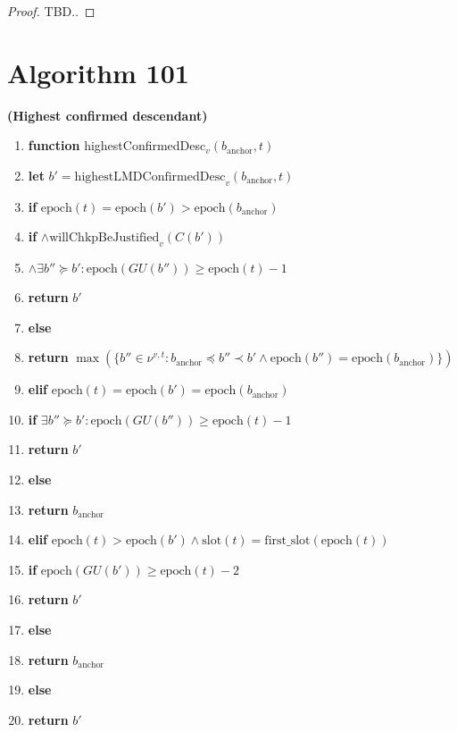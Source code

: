 \documentclass{article}
\begin{document}
\begin{proof}
    TBD..
\end{proof}

\section*{Algorithm 101}
\textbf{(Highest confirmed descendant)}

\begin{enumerate}
    \item \textbf{function} highestConfirmedDesc$_v(b_{\text{anchor}}, t)$
    \item \quad \textbf{let} $b' = \text{highestLMDConfirmedDesc}_v(b_{\text{anchor}}, t)$
    \item \quad \textbf{if} $\text{epoch}(t) = \text{epoch}(b') > \text{epoch}(b_{\text{anchor}})$
    \item \quad \quad \textbf{if} $\wedge \text{willChkpBeJustified}_v(C(b'))$
    \item \quad \quad \quad $\wedge \exists b'' \succeq b' : \text{epoch}(GU(b'')) \geq \text{epoch}(t) - 1$
    \item \quad \quad \quad \quad \textbf{return} $b'$
    \item \quad \quad \textbf{else}
    \item \quad \quad \quad \quad \textbf{return} $\max(\{b'' \in \nu^{v,t} : b_{\text{anchor}} \preceq b'' \prec b' \wedge \text{epoch}(b'') = \text{epoch}(b_{\text{anchor}})\})$
    \item \quad \textbf{elif} $\text{epoch}(t) = \text{epoch}(b') = \text{epoch}(b_{\text{anchor}})$
    \item \quad \quad \textbf{if} $\exists b'' \succeq b' : \text{epoch}(GU(b'')) \geq \text{epoch}(t) - 1$
    \item \quad \quad \quad \textbf{return} $b'$
    \item \quad \quad \textbf{else}
    \item \quad \quad \quad \textbf{return} $b_{\text{anchor}}$
    \item \quad \textbf{elif} $\text{epoch}(t) > \text{epoch}(b') \wedge \text{slot}(t) = \text{first\_slot}(\text{epoch}(t))$
    \item \quad \quad \textbf{if} $\text{epoch}(GU(b')) \geq \text{epoch}(t) - 2$
    \item \quad \quad \quad \textbf{return} $b'$
    \item \quad \quad \textbf{else}
    \item \quad \quad \quad \textbf{return} $b_{\text{anchor}}$
    \item \quad \textbf{else}
    \item \quad \quad \textbf{return} $b'$
\end{enumerate}
\end{document}
